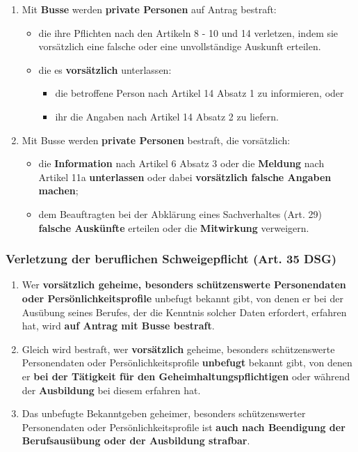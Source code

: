 \begin{enumerate}
	\tightlist
	\item Mit \textbf{Busse} werden \textbf{private Personen} auf Antrag
	bestraft:
	\begin{itemize}
		\tightlist
		\item die ihre Pflichten nach den Artikeln 8 - 10 und 14 verletzen, indem
		sie vorsätzlich eine falsche oder eine unvollständige Auskunft
		erteilen.
		\item die es \textbf{vorsätzlich} unterlassen:
		\begin{itemize}
			\tightlist
			\item die betroffene Person nach Artikel 14 Absatz 1 zu informieren,
			oder
			\item ihr die Angaben nach Artikel 14 Absatz 2 zu liefern.
		\end{itemize}
	\end{itemize}
	\item Mit Busse werden \textbf{private Personen} bestraft, die vorsätzlich:
	\begin{itemize}
		\tightlist
		\item die \textbf{Information} nach Artikel 6 Absatz 3 oder die
		\textbf{Meldung} nach Artikel 11a \textbf{unterlassen} oder dabei
		\textbf{vorsätzlich falsche Angaben machen};
		\item dem Beauftragten bei der Abklärung eines Sachverhaltes (Art. 29)
		\textbf{falsche Auskünfte} erteilen oder die \textbf{Mitwirkung}
		verweigern.
	\end{itemize}
\end{enumerate}

\subsubsection{Verletzung der beruflichen Schweigepflicht (Art. 35 DSG)}
\label{sec:Datenschutz-Schweigepflicht}

\begin{enumerate}
	\tightlist
	\item Wer \textbf{vorsätzlich geheime, besonders schützenswerte
	Personendaten oder Persönlichkeitsprofile} unbefugt bekannt gibt, von denen
	er bei der Ausübung seines Berufes, der die Kenntnis solcher Daten
	erfordert, erfahren hat, wird \textbf{auf Antrag mit Busse bestraft}.
	\item Gleich wird bestraft, wer \textbf{vorsätzlich} geheime, besonders
	schützenswerte Personendaten oder Persönlichkeitsprofile \textbf{unbefugt}
	bekannt gibt, von denen er \textbf{bei der Tätigkeit für den
	Geheimhaltungspflichtigen} oder während der \textbf{Ausbildung} bei diesem
	erfahren hat.
	\item Das unbefugte Bekanntgeben geheimer, besonders schützenswerter
	Personendaten oder	Persönlichkeitsprofile ist \textbf{auch nach Beendigung
	der Berufsausübung oder der	Ausbildung strafbar}.
\end{enumerate}

